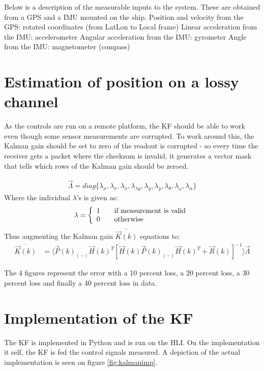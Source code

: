 Below is a description of the measurable inputs to the system. These are obtained from a \ac{GPS} and a \ac{IMU} mounted on the ship.
Position and velocity from the \ac{GPS}: rotated coordinates (from LatLon to Local frame)
Linear acceleration from the \ac{IMU}: accelerometer
Angular acceleration from the \ac{IMU}: gyrometer
Angle from the \ac{IMU}: magnetometer (compass)

\section{Estimation of position on a lossy channel}
As the controls are run on a remote platform, the \ac{KF} should be able to work even though some sensor measurements are corrupted. To work around this, the Kalman gain should be set to zero of the readout is corrupted - so every time the receiver gets a packet where the checksom is invalid, it generates a vector mask that tells which rows of the Kalman gain should be zeroed. 

\begin{align}
\vec{\Lambda} = diag\{\lambda_x,\lambda_{\dot{x}},\lambda_{\ddot{x}},\lambda_{\lambda{y}},\lambda_{\dot{y}},\lambda_{\ddot{y}},\lambda_{\theta},\lambda_{\omega},\lambda_{\alpha} \}
\end{align}
\noindent Where the individual $\lambda$'s is given as: 
\begin{align}
\lambda = 
\left\{ 
  \begin{array}{l l}
    1 & \quad \text{if measurement is valid}\\
    0 & \quad \text{otherwise}
  \end{array} \right.
\end{align} 
Thus augmenting the Kalman gain $\bar{\vec{K}(k)}$ equations to:
\begin{align}
\bar{\vec{K}(k)} &= \langle\vec{P}(k)_{(-)} \vec{H}(k)^T [\vec{H}(k)\vec{P}(k)_{(-)} \vec{H}(k)^T + \vec{R}(k)]^{-1}\rangle\vec{\Lambda} 
\end{align} 

The 4 figures represent the error with a 10 percent loss, a 20 percent loss, a 30 percent loss and finally a 40 percent loss in data. 

\section{Implementation of the \ac{KF}}
The \ac{KF} is implemented in Python and is run on the \ac{HLI}. On the implementation it self, the \ac{KF} is fed the control signals measured. A depiction of the actual implementation is seen on figure \vref{fig:kalmanimp}.

